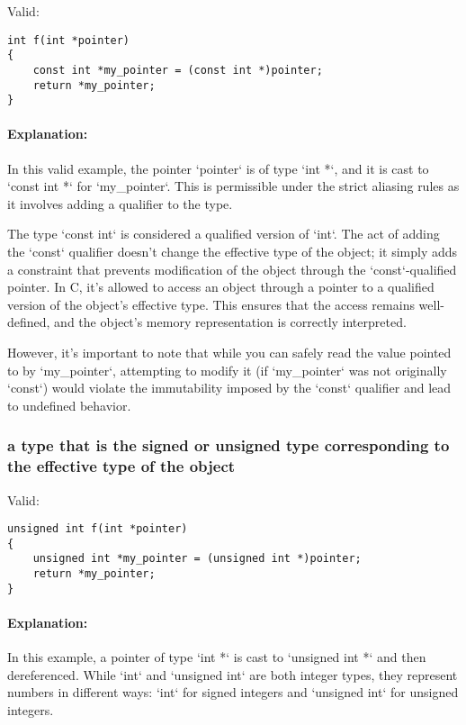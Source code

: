 \documentclass[12pt]{article}
\begin{document}
Valid:

\begin{verbatim}
int f(int *pointer)
{
    const int *my_pointer = (const int *)pointer;
    return *my_pointer;
}
\end{verbatim}

\paragraph{Explanation:}
In this valid example, the pointer `pointer` is of type `int *`, and it is cast to `const int *` for `my\_pointer`. This is permissible under the strict aliasing rules as it involves adding a qualifier to the type. 

The type `const int` is considered a qualified version of `int`. The act of adding the `const` qualifier doesn't change the effective type of the object; it simply adds a constraint that prevents modification of the object through the `const`-qualified pointer. In C, it's allowed to access an object through a pointer to a qualified version of the object's effective type. This ensures that the access remains well-defined, and the object's memory representation is correctly interpreted.

However, it's important to note that while you can safely read the value pointed to by `my\_pointer`, attempting to modify it (if `my\_pointer` was not originally `const`) would violate the immutability imposed by the `const` qualifier and lead to undefined behavior.

\subsubsection{a type that is the signed or unsigned type corresponding to the effective type of the object}

Valid:
\begin{verbatim}
unsigned int f(int *pointer)
{
    unsigned int *my_pointer = (unsigned int *)pointer;
    return *my_pointer;
}
\end{verbatim}
\paragraph{Explanation:}
In this example, a pointer of type `int *` is cast to `unsigned int *` and then dereferenced. While `int` and `unsigned int` are both integer types, they represent numbers in different ways: `int` for signed integers and `unsigned int` for unsigned integers. 
\end{document}
